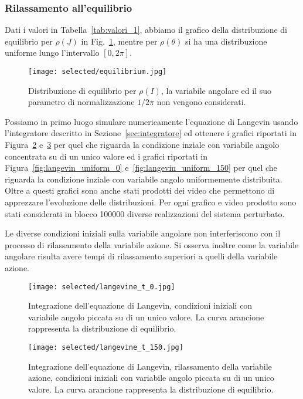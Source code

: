 \documentclass[10pt,a4paper]{article}
\begin{document}
\subsubsection{Rilassamento all'equilibrio}

Dati i valori in Tabella~\ref{tab:valori_1}, abbiamo il grafico della distribuzione di equilibrio per \(\rho(J)\) in Fig.~\ref{fig:equilibrio_J_1}, mentre per \(\rho(\theta)\) si ha una distribuzione uniforme lungo l'intervallo \([0,2\pi]\).

\begin{figure}[p]
	\centering
	\texttt{[image: selected/equilibrium.jpg]}
	\caption{Distribuzione di equilibrio per \(\rho(I)\), la variabile angolare ed il suo parametro di normalizzazione $1/2\pi$ non vengono considerati.}
	\label{fig:equilibrio_J_1}
\end{figure}

Possiamo in primo luogo simulare numericamente l'equazione di Langevin usando l'integratore descritto in Sezione~\ref{sec:integratore} ed ottenere i grafici riportati in Figura~\ref{fig:langevin_0} e~\ref{fig:langevin_150} per quel che riguarda la condizione inziale con variabile angolo concentrata su di un unico valore ed i grafici riportati in Figura~\ref{fig:langevin_uniform_0} e~\ref{fig:langevin_uniform_150} per quel che riguarda la condizione inziale con variabile angolo uniformemente distribuita. Oltre a questi grafici sono anche stati prodotti dei video che permettono di apprezzare l'evoluzione delle distribuzioni. Per ogni grafico e video prodotto sono stati considerati in blocco 100000 diverse realizzazioni del sistema perturbato.

Le diverse condizioni iniziali sulla variabile angolare non interferiscono con il processo di rilassamento della variabile azione. Si osserva inoltre come la variabile angolare risulta avere tempi di rilassamento superiori a quelli della variabile azione.

\begin{figure}[p]
	\centering
	\texttt{[image: selected/langevine\_t\_0.jpg]}
	\caption{Integrazione dell'equazione di Langevin, condizioni iniziali con variabile angolo piccata su di un unico valore. La curva arancione rappresenta la distribuzione di equilibrio.}
	\label{fig:langevin_0}
\end{figure}

\begin{figure}[p]
	\centering
	\texttt{[image: selected/langevine\_t\_150.jpg]}
	\caption{Integrazione dell'equazione di Langevin, rilassamento della variabile azione, condizioni iniziali con variabile angolo piccata su di un unico valore. La curva arancione rappresenta la distribuzione di equilibrio.}
	\label{fig:langevin_150}
\end{figure}
\end{document}

